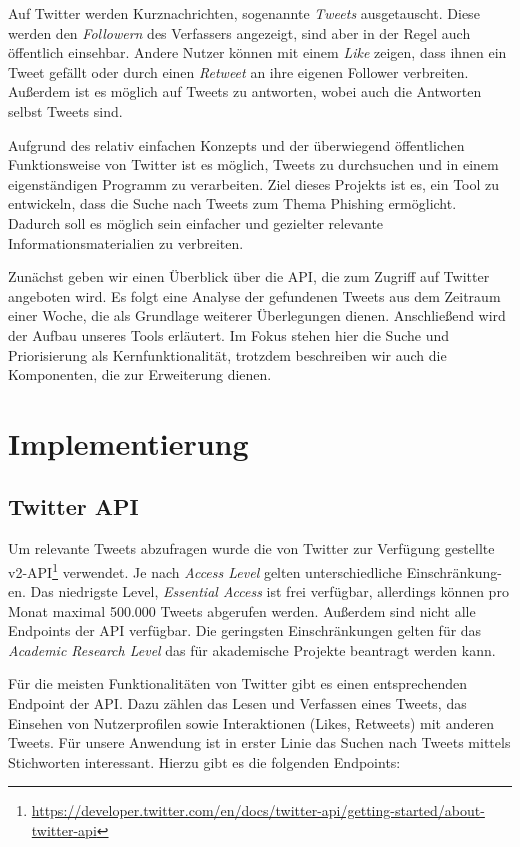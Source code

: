 \documentclass[runningheads]{llncs}
\begin{document}
Auf Twitter werden Kurznachrichten, sogenannte \textit{Tweets} ausgetauscht.
Diese werden den \textit{Followern} des Verfassers angezeigt, sind aber in der Regel auch öffentlich einsehbar.
Andere Nutzer können mit einem \textit{Like} zeigen, dass ihnen ein Tweet gefällt oder durch einen \textit{Retweet} an ihre eigenen Follower verbreiten.
Außerdem ist es möglich auf Tweets zu antworten, wobei auch die Antworten selbst Tweets sind.

Aufgrund des relativ einfachen Konzepts und der überwiegend öffentlichen Funktionsweise von Twitter ist es möglich, Tweets zu durchsuchen und in einem eigenständigen Programm zu verarbeiten.
Ziel dieses Projekts ist es, ein Tool zu entwickeln, dass die Suche nach Tweets zum Thema Phishing ermöglicht.
Dadurch soll es möglich sein einfacher und gezielter relevante Informationsmaterialien zu verbreiten.

Zunächst geben wir einen Überblick über die API, die zum Zugriff auf Twitter angeboten wird.
Es folgt eine Analyse der gefundenen Tweets aus dem Zeitraum einer Woche, die als Grundlage weiterer Überlegungen dienen.
Anschließend wird der Aufbau unseres Tools erläutert.
Im Fokus stehen hier die Suche und Priorisierung als Kernfunktionalität, trotzdem beschreiben wir auch die Komponenten, die zur Erweiterung dienen.

\section{Implementierung}
\subsection{Twitter API}
Um relevante Tweets abzufragen wurde die von Twitter zur Verfügung gestellte v2-API\footnote{\url{https://developer.twitter.com/en/docs/twitter-api/getting-started/about-twitter-api}} verwendet.
Je nach \textit{Access Level} gelten unterschiedliche Einschränkung-en.
Das niedrigste Level, \textit{Essential Access} ist frei verfügbar, allerdings können pro Monat maximal 500.000 Tweets abgerufen werden.
Außerdem sind nicht alle Endpoints der API verfügbar.
Die geringsten Einschränkungen gelten für das \textit{Academic Research Level} das für akademische Projekte beantragt werden kann.

Für die meisten Funktionalitäten von Twitter gibt es einen entsprechenden Endpoint der API.
Dazu zählen das Lesen und Verfassen eines Tweets, das Einsehen von Nutzerprofilen sowie Interaktionen (Likes, Retweets) mit anderen Tweets.
Für unsere Anwendung ist in erster Linie das Suchen nach Tweets mittels Stichworten interessant.
Hierzu gibt es die folgenden Endpoints:
\end{document}
